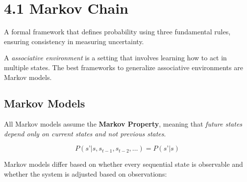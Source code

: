 \documentclass[
  letterpaper,
  DIV=11,
  numbers=noendperiod]{scrreprt}
\begin{document}
\chapter{4.1 Markov Chain}\label{markov-chain}

\begin{tcolorbox}[enhanced jigsaw, arc=.35mm, toprule=.15mm, leftrule=.75mm, colback=white, left=2mm, colframe=quarto-callout-note-color-frame, rightrule=.15mm, opacityback=0, breakable, bottomrule=.15mm]

A formal framework that defines probability using three fundamental
rules, ensuring consistency in measuring uncertainty. 🎲

\end{tcolorbox}

\begin{tcolorbox}[enhanced jigsaw, toprule=.15mm, leftrule=.75mm, coltitle=black, left=2mm, opacityback=0, titlerule=0mm, arc=.35mm, toptitle=1mm, opacitybacktitle=0.6, bottomtitle=1mm, colframe=quarto-callout-tip-color-frame, title=\textcolor{quarto-callout-tip-color}{\faLightbulb}\hspace{0.5em}{Associative Environments}, rightrule=.15mm, bottomrule=.15mm, colbacktitle=quarto-callout-tip-color!10!white, breakable, colback=white]

A \emph{associative environment} is a setting that involves learning how
to act in multiple states. The best frameworks to generalize associative
environments are Markov models.

\end{tcolorbox}

\section{Markov Models}\label{markov-models}

All Markov models assume the \textbf{Markov Property}, meaning that
\emph{future states depend only on current states and not previous
states}.

\[
P(s’ | s, s_{t-1}, s_{t-2}, \dots) = P(s’ | s)
\]

Markov models differ based on whether every sequential state is
observable and whether the system is adjusted based on observations:
\end{document}

